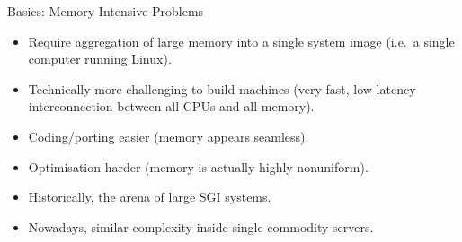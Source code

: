 \begin{frame}{Basics: Memory Intensive Problems}
\begin{itemize}
\item{Require aggregation of large memory into a \alert{single system image} (i.e.\ a single computer running Linux).}
\pause
\item{Technically more challenging to build machines (very fast, low latency interconnection between \alert{all} CPUs and \alert{all} memory).}
\pause
\item{Coding/porting easier (memory appears seamless).}
\pause
\item{Optimisation harder (memory is actually highly nonuniform).}
\pause
\item{Historically, the arena of large \alert{SGI} systems.}
\pause
\item{Nowadays, similar complexity inside single commodity servers.}
\end{itemize}
\end{frame}








